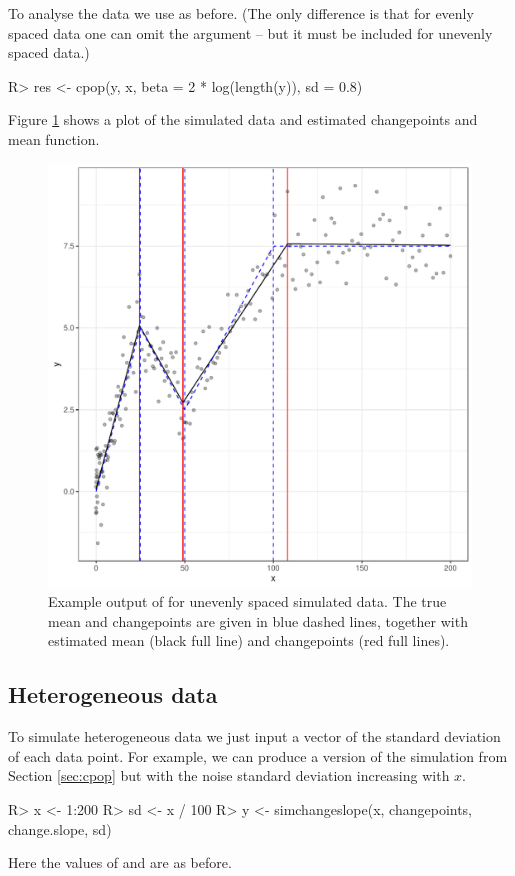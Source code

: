 \documentclass[article]{jss}
\begin{document}
To analyse the data we use  as before. (The only difference is that for evenly spaced data one can omit the  argument -- but it must be included for unevenly spaced data.)
\begin{CodeChunk}
\begin{CodeInput}
R> res <- cpop(y, x, beta = 2 * log(length(y)), sd = 0.8)
\end{CodeInput}
\end{CodeChunk}
%
%
Figure \ref{fig:cpop-example-uneven} shows a plot of the simulated data and estimated changepoints and mean function.

\begin{figure}
\centering
\includegraphics[width=0.6\linewidth]{figures/cpop_example_uneven_ggplot.pdf}
\caption{Example output of  for unevenly spaced simulated data. The true mean and changepoints are given in blue dashed lines, together with estimated mean (black full line) and changepoints (red full lines). }
\label{fig:cpop-example-uneven}
\end{figure}
%
%
\subsection{Heterogeneous data}

To simulate heterogeneous data we just input a vector of the standard deviation of each data point. For example, we can produce a version of the simulation from Section \ref{sec:cpop} but with the noise standard deviation increasing with $x$.

\begin{CodeChunk}
\begin{CodeInput}
R> x <- 1:200
R> sd <- x / 100
R> y <- simchangeslope(x, changepoints, change.slope, sd)
\end{CodeInput}
\end{CodeChunk}
%
%
Here the values of  and  are as before.
\end{document}

